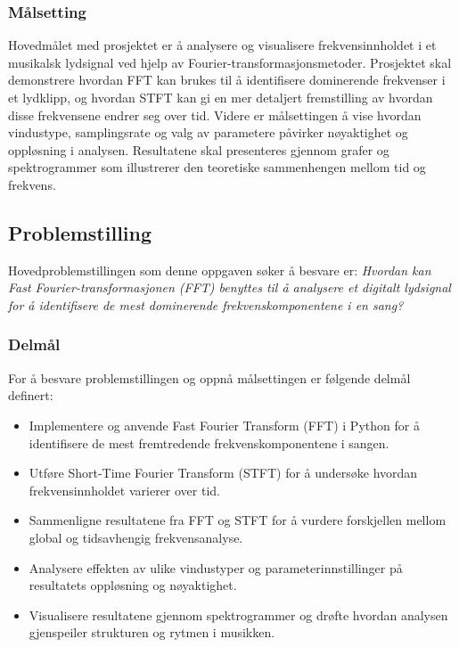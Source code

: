 \subsubsection{Målsetting}
Hovedmålet med prosjektet er å analysere og visualisere frekvensinnholdet i et musikalsk lydsignal ved hjelp av 
Fourier-transformasjonsmetoder. Prosjektet skal demonstrere hvordan FFT kan brukes til å identifisere dominerende 
frekvenser i et lydklipp, og hvordan STFT kan gi en mer detaljert fremstilling av hvordan disse frekvensene endrer seg over tid.
Videre er målsettingen å vise hvordan vindustype, samplingsrate og valg av parametere påvirker nøyaktighet og oppløsning i analysen. 
Resultatene skal presenteres gjennom grafer og spektrogrammer som illustrerer den teoretiske sammenhengen mellom tid og frekvens.




\subsection{Problemstilling}
Hovedproblemstillingen som denne oppgaven søker å besvare er:
\textit{Hvordan kan Fast Fourier-transformasjonen (FFT) benyttes til å analysere et digitalt lydsignal 
for å identifisere de mest dominerende frekvenskomponentene i en sang?}

\subsubsection{Delmål}
For å besvare problemstillingen og oppnå målsettingen er følgende delmål definert:

\begin{itemize}
\item Implementere og anvende Fast Fourier Transform (FFT) i Python for å identifisere de mest fremtredende frekvenskomponentene i sangen.
\item Utføre Short-Time Fourier Transform (STFT) for å undersøke hvordan frekvensinnholdet varierer over tid.
\item Sammenligne resultatene fra FFT og STFT for å vurdere forskjellen mellom global og tidsavhengig frekvensanalyse.
\item Analysere effekten av ulike vindustyper og parameterinnstillinger på resultatets oppløsning og nøyaktighet.
\item Visualisere resultatene gjennom spektrogrammer og drøfte hvordan analysen gjenspeiler strukturen og rytmen i musikken.
\end{itemize}



